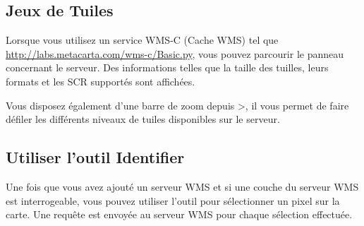 \subsection{Jeux de Tuiles}\label{sec:tilesets}

Lorsque vous utilisez un service WMS-C (Cache WMS) tel que \url{http://labs.metacarta.com/wms-c/Basic.py}, vous pouvez parcourir le panneau  concernant le serveur. Des informations telles que la taille des tuilles, leurs formats et les SCR supportés sont affichées.

Vous disposez également d'une barre de zoom depuis >, il vous permet de faire défiler les différents niveaux de tuiles disponibles sur le serveur.

\subsection{Utiliser l'outil Identifier}\label{sec:ogc-wms-identify}

Une fois que vous avez ajouté un serveur WMS et si une couche du serveur WMS est interrogeable, vous pouvez utiliser l'outil   pour sélectionner un pixel sur la carte. Une requête est envoyée au serveur WMS pour chaque sélection effectuée.

